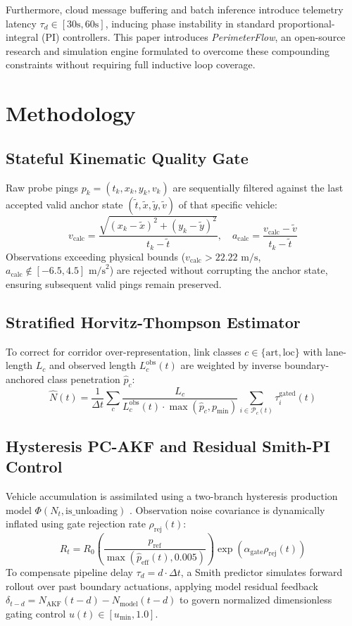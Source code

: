\documentclass[lettersize,journal]{IEEEtran}
\begin{document}
Furthermore, cloud message buffering and batch inference introduce telemetry latency $\tau_d \in [30\text{s}, 60\text{s}]$, inducing phase instability in standard proportional-integral (PI) controllers. This paper introduces \textit{PerimeterFlow}, an open-source research and simulation engine formulated to overcome these compounding constraints without requiring full inductive loop coverage.

\section{Methodology}
\subsection{Stateful Kinematic Quality Gate}
Raw probe pings $p_k = (t_k, x_k, y_k, v_k)$ are sequentially filtered against the last accepted valid anchor state $(\tilde{t}, \tilde{x}, \tilde{y}, \tilde{v})$ of that specific vehicle:
\begin{equation}
v_{\text{calc}} = \frac{\sqrt{(x_k - \tilde{x})^2 + (y_k - \tilde{y})^2}}{t_k - \tilde{t}}, \quad a_{\text{calc}} = \frac{v_{\text{calc}} - \tilde{v}}{t_k - \tilde{t}}
\end{equation}
Observations exceeding physical bounds ($v_{\text{calc}} > 22.22\text{ m/s}$, $a_{\text{calc}} \notin [-6.5, 4.5]\text{ m/s}^2$) are rejected without corrupting the anchor state, ensuring subsequent valid pings remain preserved.

\subsection{Stratified Horvitz-Thompson Estimator}
To correct for corridor over-representation, link classes $c \in \{\text{art}, \text{loc}\}$ with lane-length $L_c$ and observed length $L_c^{\text{obs}}(t)$ are weighted by inverse boundary-anchored class penetration $\hat{p}_c$:
\begin{equation}
\hat{N}(t) = \frac{1}{\Delta t} \sum_{c} \frac{L_c}{L_c^{\text{obs}}(t) \cdot \max(\hat{p}_c, p_{\min})} \sum_{i \in \mathcal{P}_c(t)} \tau_i^{\text{gated}}(t)
\end{equation}

\subsection{Hysteresis PC-AKF and Residual Smith-PI Control}
Vehicle accumulation is assimilated using a two-branch hysteresis production model $\Phi(N_t, \text{is\_unloading})$ \cite{saberi2014exploring}. Observation noise covariance is dynamically inflated using gate rejection rate $\rho_{\text{rej}}(t)$:
\begin{equation}
R_t = R_0 \left(\frac{p_{\text{ref}}}{\max(\hat{p}_{\text{eff}}(t), 0.005)}\right) \exp\left(\alpha_{\text{gate}} \rho_{\text{rej}}(t)\right)
\end{equation}
To compensate pipeline delay $\tau_d = d \cdot \Delta t$, a Smith predictor simulates forward rollout over past boundary actuations, applying model residual feedback $\delta_{t-d} = \hat{N}_{\text{AKF}}(t-d) - N_{\text{model}}(t-d)$ to govern normalized dimensionless gating control $u(t) \in [u_{\min}, 1.0]$.
\end{document}
